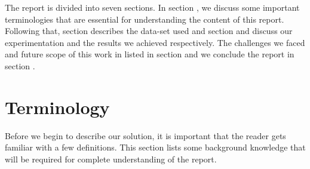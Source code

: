 \documentclass[journal]{IEEEtran}
\begin{document}
The report is divided into seven sections. In section , we discuss some important terminologies that are essential for understanding the content of this report. Following that, section describes the data-set used and section  and  discuss our experimentation and the results we achieved respectively. The challenges we faced and future scope of this work in listed in section  and we conclude the report in section .


\section{Terminology}
Before we begin to describe our solution, it is important that the reader gets familiar with a few definitions. This section lists some background knowledge that will be required for complete understanding of the report.
\end{document}
